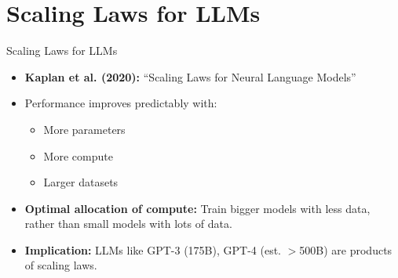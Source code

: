 \section{Scaling Laws for LLMs}
\begin{frame}{Scaling Laws for LLMs}
    \begin{itemize}
        \item \textbf{Kaplan et al. (2020):} ``Scaling Laws for Neural Language Models''
        \item Performance improves predictably with:
        \begin{itemize}
            \item More parameters
            \item More compute
            \item Larger datasets
        \end{itemize}
        \item \textbf{Optimal allocation of compute:} Train bigger models with less data, rather than small models with lots of data.
        \item \textbf{Implication:} LLMs like GPT-3 (175B), GPT-4 (est. $>$500B) are products of scaling laws.
    \end{itemize}
\end{frame}